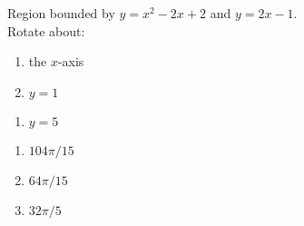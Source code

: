 {Region bounded by $y=x^2-2x+2$ and $y=2x-1$.\\
Rotate about:\\
\begin{minipage}[t]{.5\linewidth}
\begin{enumerate}
\item		the $x$-axis
\item		$y=1$
\end{enumerate}
\end{minipage}%
\begin{minipage}[t]{.5\linewidth}
\begin{enumerate}\addtocounter{enumii}{2}
\item		$y=5$
\end{enumerate}
\end{minipage}
}
{\begin{enumerate}
\item $104\pi/15$
\item $64\pi/15$
\item $32\pi/5$
\end{enumerate}
}
